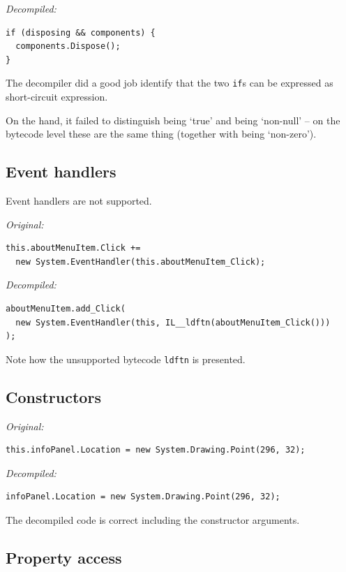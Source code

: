 \documentclass[12pt,twoside,notitlepage]{report}
\begin{document}
\emph{Decompiled:}
\begin{verbatim}
if (disposing && components) {
  components.Dispose();
}
\end{verbatim}

The decompiler did a good job identify that the two
\verb|if|s can be expressed as short-circuit expression.

On the hand, it failed to distinguish being `true' and being `non-null'
-- on the bytecode level these are the same thing (together with being `non-zero').




\subsection{Event handlers}

Event handlers are not supported.

\emph{Original:}
\begin{verbatim}
this.aboutMenuItem.Click +=
  new System.EventHandler(this.aboutMenuItem_Click);
\end{verbatim}

\emph{Decompiled:}
\begin{verbatim}
aboutMenuItem.add_Click(
  new System.EventHandler(this, IL__ldftn(aboutMenuItem_Click()))
);
\end{verbatim}

Note how the unsupported bytecode \verb|ldftn| is presented.



\subsection{Constructors}

\emph{Original:}
\begin{verbatim}
this.infoPanel.Location = new System.Drawing.Point(296, 32);
\end{verbatim}

\emph{Decompiled:}
\begin{verbatim}
infoPanel.Location = new System.Drawing.Point(296, 32);
\end{verbatim}

The decompiled code is correct including the constructor arguments.


\subsection{Property access}
\end{document}
